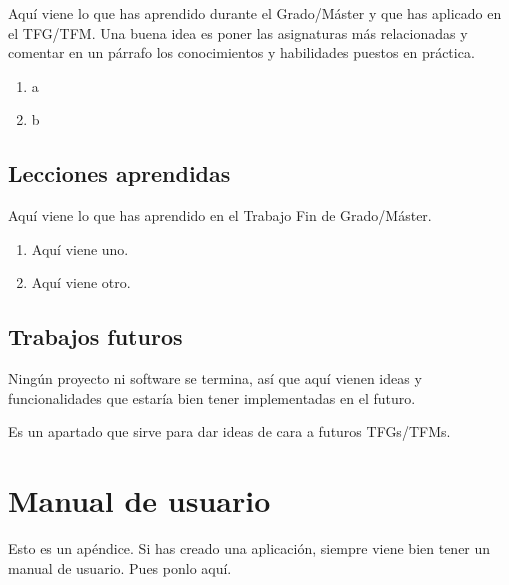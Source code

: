 \documentclass[a4paper, 12pt]{book}
\begin{document}
Aquí viene lo que has aprendido durante el Grado/Máster y que has aplicado en el TFG/TFM. Una buena idea es poner las asignaturas más relacionadas y comentar en un párrafo los conocimientos y habilidades puestos en práctica.

\begin{enumerate}
  \item a
  \item b
\end{enumerate}


\section{Lecciones aprendidas}
\label{sec:lecciones_aprendidas}

Aquí viene lo que has aprendido en el Trabajo Fin de Grado/Máster.

\begin{enumerate}
  \item Aquí viene uno.
  \item Aquí viene otro.
\end{enumerate}


\section{Trabajos futuros}
\label{sec:trabajos_futuros}

Ningún proyecto ni software se termina, así que aquí vienen ideas y funcionalidades que estaría bien tener implementadas en el futuro.

Es un apartado que sirve para dar ideas de cara a futuros TFGs/TFMs.



\cleardoublepage
\appendix
\chapter{Manual de usuario}
\label{app:manual}

Esto es un apéndice.
Si has creado una aplicación, siempre viene bien tener un manual de usuario.
Pues ponlo aquí.

\end{document}

